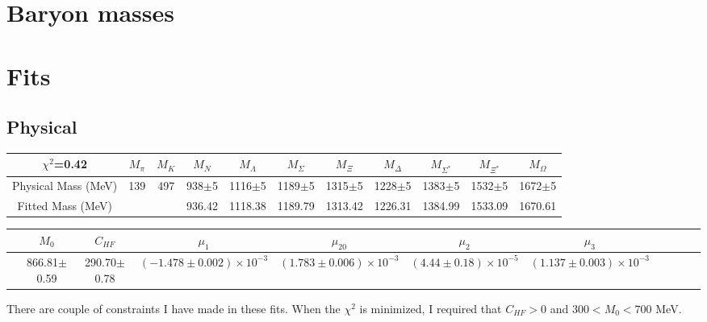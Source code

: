 \documentclass[10pt,a4paper]{article}
\begin{document}
\section{Baryon masses}

\section{Fits}

\subsection{Physical}
\begin{table}[h!]
	\begin{tabular}{ccccccccccc}
		$\chi^2$=0.42 & $M_\pi$ & $M_K$ & $M_N$ & $M_{\Lambda}$ & $M_{\Sigma}$ & $M_{\Xi}$ & $M_{\Delta}$ & $M_{\Sigma^*}$ & $M_{\Xi^*}$ & $M_{\Omega}$ \\ 
		\hline Physical Mass (MeV) & 139 & 497 & 938$\pm$5 & 1116$\pm$5  & 1189$\pm$5 & 1315$\pm$5 & 1228$\pm$5 & 1383$\pm$5 & 1532$\pm$5 & 1672$\pm$5 \\ 
		Fitted Mass (MeV) &  &  & 936.42 & 1118.38  & 1189.79  & 1313.42 & 1226.31  & 1384.99 & 1533.09 & 1670.61 \\ 
		\hline 
	\end{tabular}
\end{table}


\begin{table}[h!]
	\begin{tabular}{ccccccccccc}
	 \hline  & $M_0$ &  $C_{HF}$ &  $\mu_1$ & $\mu_{20}$ &  $\mu_2$ &  $\mu_3$ &&&&  \\
		\hline  & 866.81$\pm$0.59  & 290.70$\pm$0.78 & $(-1.478\pm0.002)\times10^{-3}$ & $(1.783\pm0.006)\times10^{-3}$ & $(4.44\pm0.18)\times10^{-5}$ & $(1.137\pm0.003)\times10^{-3}$ & & & & \\
		\hline 
	\end{tabular}
\end{table}

There are couple of constraints I have made in these fits. When the $\chi^2$ is minimized, I  required that $C_{HF}>0$ and $300<M_0<700$ MeV.
\end{document}
